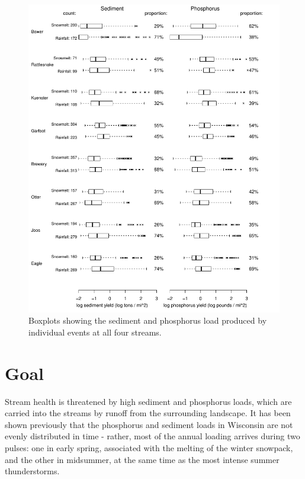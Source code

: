 \documentclass[10pt]{article}
\begin{document}
\begin{figure}[h]
    \begin{center}
\includegraphics{loadings-show_boxplots}
    \caption{Boxplots showing the sediment and phosphorus load produced by individual events at all four streams.\label{boxplots}}
    \end{center}
\end{figure}





    
    



\section{Goal}
Stream health is threatened by high sediment and phosphorus loads, which are carried into the streams by runoff from the surrounding landscape. It has been shown previously\cite{Danz:2010} that the phosphorus and sediment loads in Wisconsin are not evenly distributed in time - rather, most of the annual loading arrives during two pulses: one in early spring, associated with the melting of the winter snowpack, and the other in midsummer, at the same time as the most intense summer thunderstorms.\\
\end{document}
